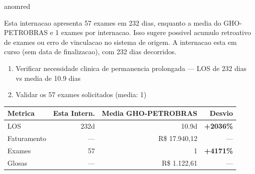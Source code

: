\documentclass[a4paper,10pt]{article}
\begin{document}
\begin{anomalycard}[Internacao 142202 | GHO-PETROBRAS | CRITICO (z=5.11)]{anomred}
\vspace{2pt}\begin{tcolorbox}[colback=severityred!20,colframe=anomred,title={\textbf{Interpretacao de Negocio}},fonttitle=\bfseries\small,left=4pt,right=4pt,top=3pt,bottom=3pt]
{\small Esta internacao apresenta 57 exames em 232 dias, enquanto a media do GHO-PETROBRAS e 1 exames por internacao. Isso sugere possivel acumulo retroativo de exames ou erro de vinculacao no sistema de origem. A internacao esta em curso (sem data de finalizacao), com 232 dias decorridos.}
\end{tcolorbox}
\begin{tcolorbox}[colback=severityyellow!30,colframe=anomorange,title={\textbf{Recomendacoes Especificas}},fonttitle=\bfseries\small,left=4pt,right=4pt,top=3pt,bottom=3pt]
\begin{enumerate}[nosep,leftmargin=16pt]
\item {\small Verificar necessidade clinica de permanencia prolongada --- LOS de 232 dias vs media de 10.9 dias}
\item {\small Validar os 57 exames solicitados (media: 1)}
\end{enumerate}
\end{tcolorbox}
\begin{center}\begin{tabular}{l r r r}\toprule\textbf{Metrica} & \textbf{Esta Intern.} & \textbf{Media GHO-PETROBRAS} & \textbf{Desvio} \\\midrule
LOS & 232d & 10.9d & \textcolor{anomred}{\textbf{+2036\%}} \\
Faturamento & --- & R\$ 17.940,12 & --- \\
Exames & 57 & 1 & \textcolor{anomred}{\textbf{+4171\%}} \\
Glosas & --- & R\$ 1.122,61 & --- \\
\bottomrule\end{tabular}\end{center}


\end{anomalycard}
\end{document}
